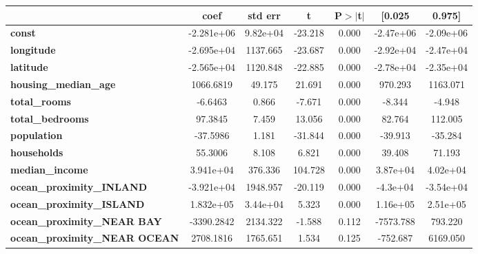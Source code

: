 \begin{center}
\begin{tabular}{lcccccc}
\toprule
                                      & \textbf{coef} & \textbf{std err} & \textbf{t} & \textbf{P$> |$t$|$} & \textbf{[0.025} & \textbf{0.975]}  \\
\midrule
\textbf{const}                        &   -2.281e+06  &     9.82e+04     &   -23.218  &         0.000        &    -2.47e+06    &    -2.09e+06     \\
\textbf{longitude}                    &   -2.695e+04  &     1137.665     &   -23.687  &         0.000        &    -2.92e+04    &    -2.47e+04     \\
\textbf{latitude}                     &   -2.565e+04  &     1120.848     &   -22.885  &         0.000        &    -2.78e+04    &    -2.35e+04     \\
\textbf{housing\_median\_age}         &    1066.6819  &       49.175     &    21.691  &         0.000        &      970.293    &     1163.071     \\
\textbf{total\_rooms}                 &      -6.6463  &        0.866     &    -7.671  &         0.000        &       -8.344    &       -4.948     \\
\textbf{total\_bedrooms}              &      97.3845  &        7.459     &    13.056  &         0.000        &       82.764    &      112.005     \\
\textbf{population}                   &     -37.5986  &        1.181     &   -31.844  &         0.000        &      -39.913    &      -35.284     \\
\textbf{households}                   &      55.3006  &        8.108     &     6.821  &         0.000        &       39.408    &       71.193     \\
\textbf{median\_income}               &    3.941e+04  &      376.336     &   104.728  &         0.000        &     3.87e+04    &     4.02e+04     \\
\textbf{ocean\_proximity\_INLAND}     &   -3.921e+04  &     1948.957     &   -20.119  &         0.000        &     -4.3e+04    &    -3.54e+04     \\
\textbf{ocean\_proximity\_ISLAND}     &    1.832e+05  &     3.44e+04     &     5.323  &         0.000        &     1.16e+05    &     2.51e+05     \\
\textbf{ocean\_proximity\_NEAR BAY}   &   -3390.2842  &     2134.322     &    -1.588  &         0.112        &    -7573.788    &      793.220     \\
\textbf{ocean\_proximity\_NEAR OCEAN} &    2708.1816  &     1765.651     &     1.534  &         0.125        &     -752.687    &     6169.050     \\
\bottomrule
\end{tabular}
\end{center}